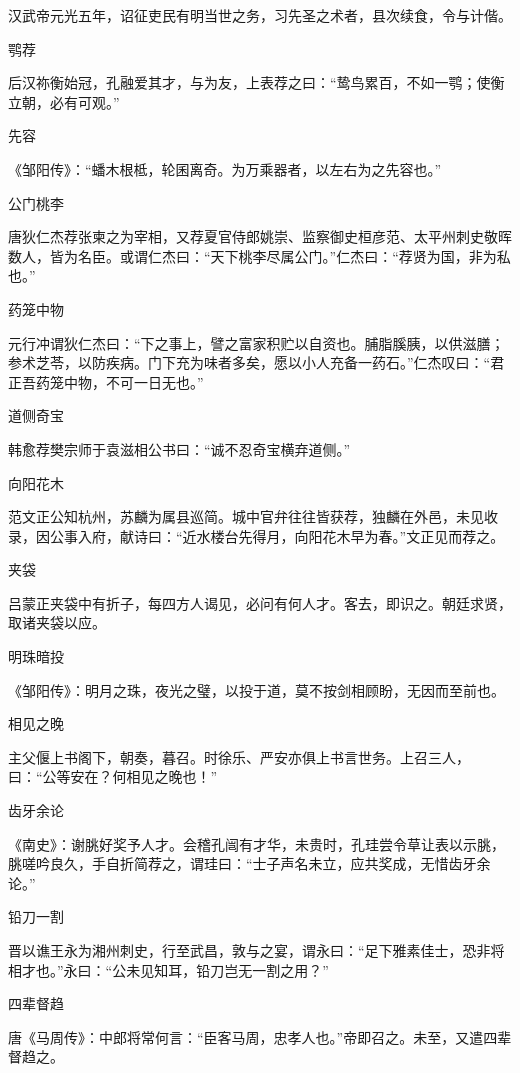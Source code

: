 \documentclass[a4paper,12pt,UTF8,twoside]{ctexbook}
\begin{document}
    汉武帝元光五年，诏征吏民有明当世之务，习先圣之术者，县次续食，令与计偕。
    
    鹗荐
    
    后汉祢衡始冠，孔融爱其才，与为友，上表荐之曰：“鸷鸟累百，不如一鹗；使衡立朝，必有可观。”
    
    先容
    
    《邹阳传》：“蟠木根柢，轮囷离奇。为万乘器者，以左右为之先容也。”
    
    公门桃李
    
    唐狄仁杰荐张柬之为宰相，又荐夏官侍郎姚崇、监察御史桓彦范、太平州刺史敬晖数人，皆为名臣。或谓仁杰曰：“天下桃李尽属公门。”仁杰曰：“荐贤为国，非为私也。”
    
    药笼中物
    
    元行冲谓狄仁杰曰：“下之事上，譬之富家积贮以自资也。脯脂膎胰，以供滋膳；参术芝苓，以防疾病。门下充为味者多矣，愿以小人充备一药石。”仁杰叹曰：“君正吾药笼中物，不可一日无也。”
    
    道侧奇宝
    
    韩愈荐樊宗师于袁滋相公书曰：“诚不忍奇宝横弃道侧。”
    
    向阳花木
    
    范文正公知杭州，苏麟为属县巡简。城中官弁往往皆获荐，独麟在外邑，未见收录，因公事入府，献诗曰：“近水楼台先得月，向阳花木早为春。”文正见而荐之。
    
    夹袋
    
    吕蒙正夹袋中有折子，每四方人谒见，必问有何人才。客去，即识之。朝廷求贤，取诸夹袋以应。
    
    明珠暗投
    
    《邹阳传》：明月之珠，夜光之璧，以投于道，莫不按剑相顾盼，无因而至前也。
    
    相见之晚
    
    主父偃上书阁下，朝奏，暮召。时徐乐、严安亦俱上书言世务。上召三人，曰：“公等安在？何相见之晚也！”
    
    齿牙余论
    
    《南史》：谢朓好奖予人才。会稽孔闿有才华，未贵时，孔珪尝令草让表以示朓，朓嗟吟良久，手自折简荐之，谓珪曰：“士子声名未立，应共奖成，无惜齿牙余论。”
    
    铅刀一割
    
    晋以谯王永为湘州刺史，行至武昌，敦与之宴，谓永曰：“足下雅素佳士，恐非将相才也。”永曰：“公未见知耳，铅刀岂无一割之用？”
    
    四辈督趋
    
    唐《马周传》：中郎将常何言：“臣客马周，忠孝人也。”帝即召之。未至，又遣四辈督趋之。
    
\end{document}
